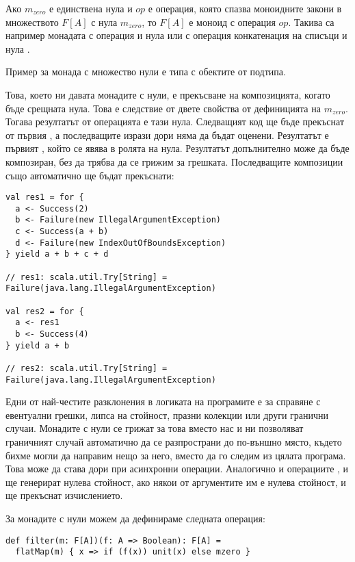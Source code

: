Ако $m_{zero}$ е единствена нула и $op$ е операция, която спазва моноидните закони в множеството $F[A]$ с нула $m_{zero}$, то $F[A]$ е моноид с операция $op$. Такива са например монадата  с операция  и нула  или  с операция конкатенация на списъци и нула .

Пример за монада с множество нули е типа  с обектите от  подтипа.

Това, което ни давата монадите с нули, е прекъсване на композицията, когато бъде срещната нула. Това е следствие от двете свойства от дефиницията на $m_{zero}$. Тогава резултатът от операцията е тази нула. Следващият код ще бъде прекъснат от първия , а последващите изрази дори няма да бъдат оценени. Резултатът е първият , който се явява в ролята на нула. Резултатът допълнително може да бъде композиран, без да трябва да се грижим за грешката. Последващите композиции също автоматично ще бъдат прекъснати:

\begin{lstlisting}
val res1 = for {
  a <- Success(2)
  b <- Failure(new IllegalArgumentException)
  c <- Success(a + b)
  d <- Failure(new IndexOutOfBoundsException)
} yield a + b + c + d

// res1: scala.util.Try[String] = Failure(java.lang.IllegalArgumentException)

val res2 = for {
  a <- res1
  b <- Success(4)
} yield a + b

// res2: scala.util.Try[String] = Failure(java.lang.IllegalArgumentException)
\end{lstlisting}

Едни от най-честите разклонения в логиката на програмите е за справяне с евентуални грешки, липса на стойност, празни колекции или други гранични случаи. Монадите с нули се грижат за това вместо нас и ни позволяват граничният случай автоматично да се разпространи до по-външно място, където бихме могли да направим нещо за него, вместо да го следим из цялата програма. Това може да става дори при асинхронни операции. Аналогично и операциите ,  и  ще генерират нулева стойност, ако някои от аргументите им е нулева стойност, и ще прекъснат изчислението.

За монадите с нули можем да дефинираме следната операция:

\begin{lstlisting}
def filter(m: F[A])(f: A => Boolean): F[A] =
  flatMap(m) { x => if (f(x)) unit(x) else mzero }
\end{lstlisting}

